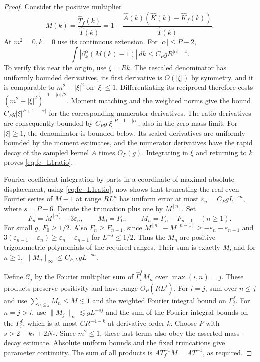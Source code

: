 \documentclass[11pt]{article}
\begin{document}
\begin{proof}
Consider the positive multiplier
\[
 M(k)=\frac{\widehat T_f(k)}{\widehat T(k)}
 =1-\frac{\widehat A(k)(\widehat K(k)-\widehat K_f(k))}{\widehat T(k)}.
\]
At \(m^2=0,k=0\) use its continuous extension. For \(|\alpha|\le P-2\),
\begin{equation}\label{eq:fc_L1ratio}
 \int |\partial_k^\alpha(M(k)-1)|\,dk\le C_P g R^{|\alpha|-4}.
\end{equation}
To verify this near the origin, use \(\xi=Rk\). The rescaled
denominator has uniformly bounded derivatives, its first derivative
is \(O(|\xi|)\) by symmetry, and it is comparable to
\(m^2+|\xi|^2\) on \(|\xi|\le1\). Differentiating its reciprocal
therefore costs \((m^2+|\xi|^2)^{-1-|\alpha|/2}\). Moment matching
and the weighted norms give the bound
\(C_Pg|\xi|^{P+1-|\alpha|}\) for the corresponding numerator
derivatives. The ratio derivatives are consequently bounded by
\(C_Pg|\xi|^{P-1-|\alpha|}\), also in the zero-mass limit.
For \(|\xi|\ge1\), the denominator is bounded below. Its
scaled derivatives are uniformly bounded by the moment estimates,
and the numerator derivatives have the rapid decay of the sampled
kernel \(A\) times \(O_P(g)\). Integrating in \(\xi\) and returning
to \(k\) proves \eqref{eq:fc_L1ratio}.

Fourier coefficient integration by parts in a coordinate of maximal
absolute displacement, using \eqref{eq:fc_L1ratio}, now shows that
truncating the real-even Fourier series of \(M-1\) at range \(RL^n\)
has uniform error at most \(\varepsilon_n=C_PgL^{-s n}\), where
\(s=P-6\). Denote the truncation plus one by \(M^{[n]}\). Set
\[
 F_n=M^{[n]}-3\varepsilon_n,\qquad
 M_0=F_0,\qquad M_n=F_n-F_{n-1}\quad(n\ge1).
\]
For small \(g\), \(F_0\ge1/2\). Also \(F_n\ge F_{n-1}\), since
\(M^{[n]}-M^{[n-1]}\ge-\varepsilon_n-\varepsilon_{n-1}\) and
\(3(\varepsilon_{n-1}-\varepsilon_n)\ge
\varepsilon_n+\varepsilon_{n-1}\) for \(L^{-s}\le1/2\).
Thus the \(M_n\) are positive trigonometric polynomials of the
required ranges. Their sum is exactly \(M\), and for \(n\ge1\),
\(\|M_n\|_\infty\le C_{P,L}gL^{-s n}\).

Define \(\mathscr C_j\) by the Fourier multiplier sum of
\(\widehat\Gamma_i^f M_n\) over \(\max(i,n)=j\). These products
preserve positivity and have range \(O_P(RL^j)\). For \(i=j\),
sum over \(n\le j\) and use \(\sum_{n\le j} M_n\le M\lesssim1\)
and the weighted Fourier integral bound on \(\Gamma_j^f\).
For \(n=j>i\), use \(\|M_j\|_\infty\lesssim gL^{-s j}\) and
the sum of the Fourier integral bounds on the \(\Gamma_i^f\),
which is at most \(CR^{-4-k}\) at derivative order \(k\).
Choose \(P\) with \(s>2+k_*+2N_*\). Since \(m^2\le1\), these
last terms also obey the asserted mass-decay estimate. Absolute
uniform bounds and the fixed truncations give parameter continuity.
The sum of all products is \(A T_f^{-1}M=A T^{-1}\), as required.
\end{proof}
\end{document}
